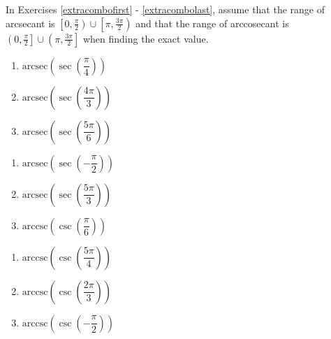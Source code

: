 In Exercises \ref{extracombofirst} - \ref{extracombolast}, assume that the range of arcsecant is $\left[0, \frac{\pi}{2} \right) \cup \left[\pi, \frac{3\pi}{2} \right)$ and that the range of arccosecant is $\left(0, \frac{\pi}{2} \right] \cup \left( \pi, \frac{3\pi}{2} \right]$ when finding the exact value.

\begin{multicols}{3}

\begin{enumerate}

\setcounter{enumi}{\value{HW}}

\item  $\text{arcsec}\left(\sec\left(\dfrac{\pi}{4}\right) \right)$  \label{extracombofirst}
\item  $\text{arcsec}\left(\sec\left(\dfrac{4\pi}{3}\right) \right)$
\item  $\text{arcsec}\left(\sec\left( \dfrac{5\pi}{6} \right) \right)$

\setcounter{HW}{\value{enumi}}

\end{enumerate}

\end{multicols}

\begin{multicols}{3}

\begin{enumerate}

\setcounter{enumi}{\value{HW}}

\item  $\text{arcsec}\left(\sec\left(-\dfrac{\pi}{2} \right) \right)$ 
\item  $\text{arcsec}\left(\sec\left(\dfrac{5\pi}{3}\right) \right)$
\item  $\text{arccsc}\left(\csc\left(\dfrac{\pi}{6}\right) \right)$ 

\setcounter{HW}{\value{enumi}}

\end{enumerate}

\end{multicols}

\begin{multicols}{3}

\begin{enumerate}

\setcounter{enumi}{\value{HW}}

\item  $\text{arccsc}\left(\csc\left(\dfrac{5\pi}{4}\right) \right)$
\item  $\text{arccsc}\left(\csc\left( \dfrac{2\pi}{3} \right) \right)$
\item  $\text{arccsc}\left(\csc\left(-\dfrac{\pi}{2} \right) \right)$ 

\setcounter{HW}{\value{enumi}}

\end{enumerate}

\end{multicols}

